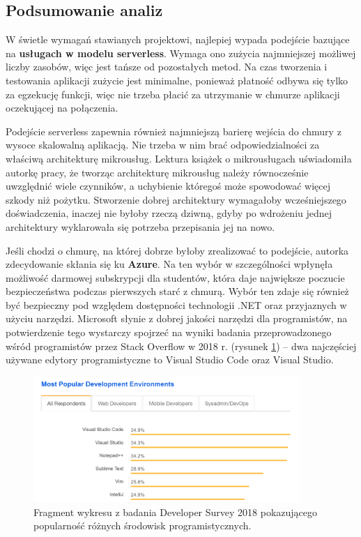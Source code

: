 \documentclass[12pt,a4paper,twoside,titlepage,openright]{book}
\begin{document}
\subsection{Podsumowanie analiz}

W świetle wymagań stawianych projektowi, najlepiej wypada podejście bazujące na \textbf{usługach w modelu serverless}. Wymaga ono zużycia najmniejszej możliwej liczby zasobów, więc jest tańsze od pozostałych metod. Na czas tworzenia i testowania aplikacji zużycie jest minimalne, ponieważ płatność odbywa się tylko za egzekucję funkcji, więc nie trzeba płacić za utrzymanie w chmurze aplikacji oczekującej na połączenia. 

Podejście serverless zapewnia również najmniejszą barierę wejścia do chmury z wysoce skalowalną aplikacją. Nie trzeba w nim brać odpowiedzialności za właściwą architekturę mikrousług. Lektura książek\cite{microservicesPacktNetCore, microservicesSusan, microservicesWmii} o mikrousługach uświadomiła autorkę pracy, że tworząc architekturę mikrousług należy równocześnie uwzględnić wiele czynników, a uchybienie któregoś może spowodować więcej szkody niż pożytku. Stworzenie dobrej architektury wymagałoby wcześniejszego doświadczenia, inaczej nie byłoby rzeczą dziwną, gdyby po wdrożeniu jednej architektury wyklarowała się potrzeba przepisania jej na nowo.

Jeśli chodzi o chmurę, na której dobrze byłoby zrealizować to podejście, autorka zdecydowanie skłania się ku \textbf{Azure}. Na ten wybór w szczególności wpłynęła możliwość darmowej subskrypcji dla studentów, która daje największe poczucie bezpieczeństwa podczas pierwszych starć z chmurą. Wybór ten zdaje się również być bezpieczny pod względem dostępności technologii .NET oraz przyjaznych w użyciu narzędzi. Microsoft słynie z dobrej jakości narzędzi dla programistów, na potwierdzenie tego wystarczy spojrzeć na wyniki badania przeprowadzonego wśród programistów przez Stack Overflow w 2018 r. (rysunek \ref{fig:stackOverflowSurvey}) -- dwa najczęściej używane edytory programistyczne to Visual Studio Code oraz Visual Studio. 

\begin{figure}[h]
	\centering
			\includegraphics[width=0.9\textwidth]{stackOverflowSurvey.png}
		\caption{Fragment wykresu z badania Developer Survey 2018 pokazującego popularność różnych środowisk programistycznych. \cite{siteStackOverflowSurvey}}
		\label{fig:stackOverflowSurvey}
\end{figure} 
\end{document}

